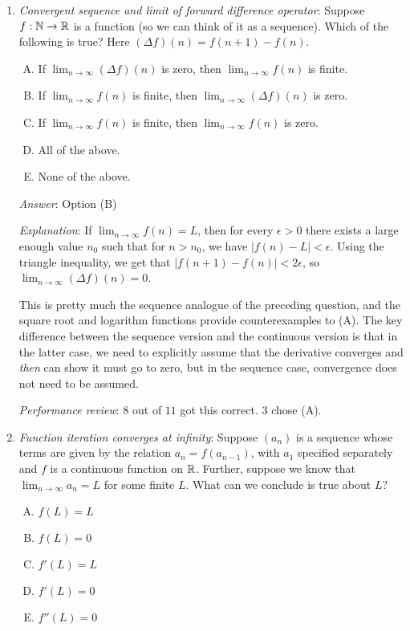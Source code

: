 \documentclass[10pt]{amsart}
\begin{document}
\begin{enumerate}
\item {\em Convergent sequence and limit of forward difference
  operator}: Suppose $f: \mathbb{N} \to \mathbb{R}$ is a function (so we can think of
  it as a sequence). Which of the following is true? Here $(\Delta
  f)(n) =f(n+1) - f(n)$.

  \begin{enumerate}[(A)]
  \item If $\lim_{n \to \infty} (\Delta f)(n)$ is zero, then $\lim_{n \to
    \infty} f(n)$ is finite.
  \item If $\lim_{n \to \infty} f(n)$ is finite, then $\lim_{n \to
    \infty} (\Delta f)(n)$ is zero.
  \item If $\lim_{n \to \infty} f(n)$ is finite, then $\lim_{n \to
    \infty} f(n)$ is zero.
  \item All of the above.
  \item None of the above.
  \end{enumerate}

  {\em Answer}: Option (B)

  {\em Explanation}: If $\lim_{n \to \infty} f(n) = L$, then for every
  $\epsilon > 0$ there exists a large enough value $n_0$ such that for
  $n > n_0$, we have $|f(n) - L| < \epsilon$. Using the triangle
  inequality, we get that $|f(n + 1) - f(n)| < 2\epsilon$, so $\lim_{n
  \to \infty} (\Delta f)(n) = 0$.

  This is pretty much the sequence analogue of the preceding question,
  and the square root and logarithm functions provide counterexamples
  to (A). The key difference between the sequence version and the
  continuous version is that in the latter case, we need to explicitly
  assume that the derivative converges and {\em then} can show it must
  go to zero, but in the sequence case, convergence does not need to
  be assumed.

  {\em Performance review}: $8$ out of $11$ got this correct. $3$
  chose (A).

\item {\em Function iteration converges at infinity}: Suppose $(a_n)$
  is a sequence whose terms are given by the relation $a_n =
  f(a_{n-1})$, with $a_1$ specified separately and $f$ is a continuous
  function on $\mathbb{R}$. Further, suppose we know that $\lim_{n \to \infty}
  a_n = L$ for some finite $L$. What can we conclude is true about
  $L$?

  \begin{enumerate}[(A)]
  \item $f(L) = L$
  \item $f(L) = 0$
  \item $f'(L) = L$
  \item $f'(L) = 0$
  \item $f''(L) = 0$
  \end{enumerate}


\end{enumerate}
\end{document}
